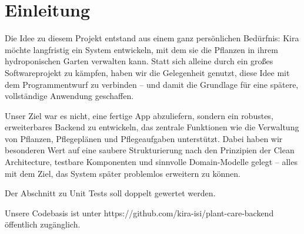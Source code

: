 \chapter{Einleitung}
Die Idee zu diesem Projekt entstand aus einem ganz persönlichen Bedürfnis: Kira möchte langfristig ein System entwickeln, mit dem sie die
Pflanzen in ihrem hydroponischen Garten verwalten kann. Statt sich alleine durch ein großes Softwareprojekt zu kämpfen, haben wir die
Gelegenheit genutzt, diese Idee mit dem Programmentwurf zu verbinden – und damit die Grundlage für eine spätere, vollständige Anwendung
geschaffen.

Unser Ziel war es nicht, eine fertige App abzuliefern, sondern ein robustes, erweiterbares Backend zu entwickeln, das zentrale Funktionen wie
die Verwaltung von Pflanzen, Pflegeplänen und Pflegeaufgaben unterstützt. Dabei haben wir besonderen Wert auf eine saubere Strukturierung nach
den Prinzipien der Clean Architecture, testbare Komponenten und sinnvolle Domain-Modelle gelegt – alles mit dem Ziel, das System später
problemlos erweitern zu können.

Der Abschnitt zu Unit Tests soll doppelt gewertet werden.

Unsere Codebasis ist unter https://github.com/kira-isi/plant-care-backend öffentlich zugänglich.